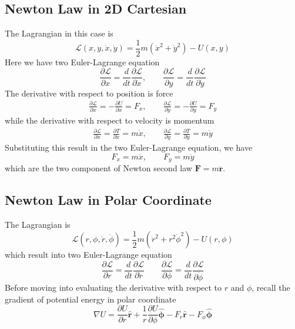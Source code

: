 \documentclass[../../../main.tex]{subfiles}
\begin{document}
\subsection*{Newton Law in 2D Cartesian}
The Lagrangian in this case is 
\begin{equation*}
  \mathcal{L}(x,y,\dot{x},\dot{y})=\frac{1}{2}m(\dot{x}^2+\dot{y}^2)-U(x,y)
\end{equation*}
Here we have two Euler-Lagrange equation
\begin{equation*}
  \frac{\partial \mathcal{L}}{\partial x}=\frac{d}{dt}\frac{\partial \mathcal{L}}{\partial \dot{x}},\qquad
  \frac{\partial \mathcal{L}}{\partial y}=\frac{d}{dt}\frac{\partial \mathcal{L}}{\partial \dot{y}}
\end{equation*}
The derivative with respect to position is force
\begin{align*}
  \frac{\partial \mathcal{L}}{\partial x}=-\frac{\partial U}{\partial x}=F_x,\qquad
  \frac{\partial \mathcal{L}}{\partial y}=-\frac{\partial U}{\partial y}=F_y
\end{align*}
while the derivative with respect to velocity is momentum
\begin{align*}
  \frac{\partial\mathcal{L}}{\partial \dot{x}}=\frac{\partial T}{\partial \dot{x}}=m\dot{x}, \qquad
  \frac{\partial\mathcal{L}}{\partial \dot{y}}=\frac{\partial T}{\partial \dot{y}}=m\dot{y}
\end{align*}
Substituting this result in the two Euler-Lagrange equation, we have 
\begin{equation*}
  F_x=m\ddot{x},\qquad F_y=m\ddot{y}
\end{equation*}
which are the two component of Newton second law $\mathbf{F}=m\mathbf{\ddot{r}}$.

\subsection*{Newton Law in Polar Coordinate}
The Lagrangian is 
\begin{equation*}
  \mathcal{L}(r,\phi,\dot{r},\dot{\phi})=\frac{1}{2}m(\dot{r}^2+r^2\dot{\phi}^2)-U(r,\phi)
\end{equation*}
which result into two Euler-Lagrange equation
\begin{equation*}
  \frac{\partial\mathcal{L}}{\partial r}=\frac{d}{dt}\frac{\partial\mathcal{L}}{\partial \dot{r}}\qquad\frac{\partial\mathcal{L}}{\partial \phi}=\frac{d}{dt}\frac{\partial\mathcal{L}}{\partial \dot{\phi}}
\end{equation*}
Before moving into evaluating the derivative with respect to $r$ and $\phi$, recall the gradient of potential energy in polar coordinate
\begin{equation*}
  \nabla U=\frac{\partial U}{\partial r}\mathbf{\hat{{r}}}+ \frac{1}{r}\frac{\partial U}{\partial \phi}\boldsymbol{\hat{\phi}}-F_r\mathbf{\hat{r}}-F_{\phi}\boldsymbol{\hat{\phi}}
\end{equation*} 
\end{document}
